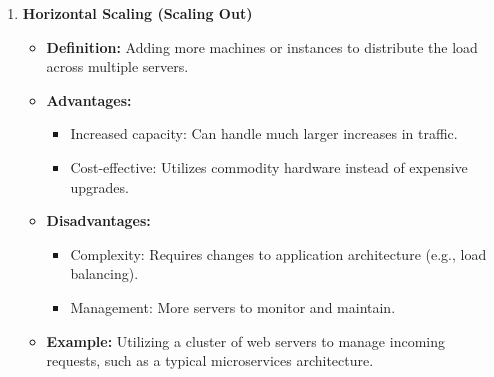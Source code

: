 \documentclass{beamer}
\begin{document}
\begin{frame}[fragile]
\begin{enumerate}
        \item \textbf{Horizontal Scaling (Scaling Out)}
            \begin{itemize}
                \item \textbf{Definition:} Adding more machines or instances to distribute the load across multiple servers.
                \item \textbf{Advantages:}
                    \begin{itemize}
                        \item Increased capacity: Can handle much larger increases in traffic.
                        \item Cost-effective: Utilizes commodity hardware instead of expensive upgrades.
                    \end{itemize}
                \item \textbf{Disadvantages:}
                    \begin{itemize}
                        \item Complexity: Requires changes to application architecture (e.g., load balancing).
                        \item Management: More servers to monitor and maintain.
                    \end{itemize}
                \item \textbf{Example:} Utilizing a cluster of web servers to manage incoming requests, such as a typical microservices architecture.
            \end{itemize}
    \end{enumerate}
\end{frame}
\end{document}
